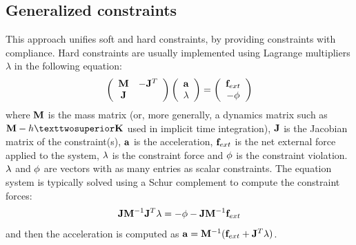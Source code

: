 \subsection{Generalized constraints}
This approach unifies soft and hard constraints, by providing constraints with compliance. Hard constraints are usually implemented using Lagrange multipliers $\lambda$ in the following equation:
\begin{equation} \label{eq acc hard}
\left( \begin{array}{cc}
\mathbf{M} & -\mathbf{J}^T \\
 \mathbf{J} &  \end{array}\right)
\left( \begin{array}{c}
\mathbf{a} \\ \mathbf{\lambda}
\end{array}\right) = \left( \begin{array}{c}
\mathbf{f}_{ext}  \\
-\phi
\end{array}\right) 
\end{equation}
where $\mathbf{M}$ is the mass matrix (or, more generally, a dynamics matrix such as $\M-h²\K$ used in implicit time integration), $\mathbf{J}$ is the Jacobian matrix of the constraint(s), $\mathbf{a}$ is the acceleration, $\mathbf{f}_{ext}$ is the net external force applied to the system, $\mathbf{\lambda}$ is the constraint force and $\phi$ is the constraint violation.
$\mathbf{\lambda}$ and $\phi$ are vectors with as many entries as scalar constraints. The equation system is typically solved using a Schur complement to compute the constraint forces:
\begin{equation}\label{eq schur rigid}
\mathbf{J} \mathbf{M}^{-1} \mathbf{J}^T \mathbf{\lambda} = -\phi - \mathbf{J} \mathbf{M}^{-1} \mathbf{f}_{ext}
\end{equation}
and then the acceleration is computed as $\mathbf{a} = \mathbf{M}^{-1}( \mathbf{f}_{ext} + \mathbf{J}^T \mathbf{\lambda})$.


